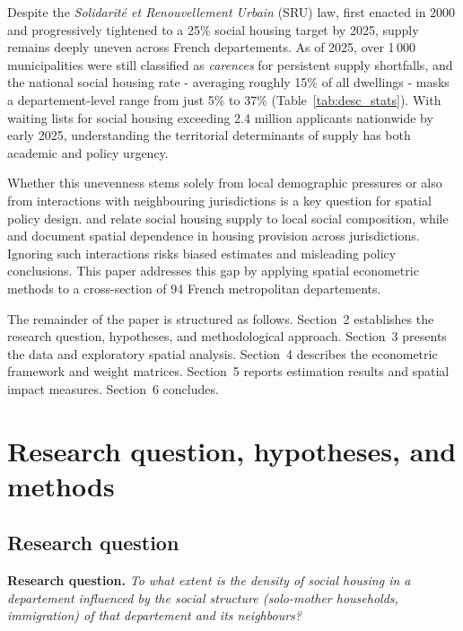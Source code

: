 \documentclass[a4paper,12pt]{article}
\begin{document}
Despite the \emph{Solidarité et Renouvellement Urbain} (SRU) law, first enacted in 2000 and progressively tightened to a 25\% social housing target by 2025, supply remains deeply uneven across French departements. As of 2025, over 1\,000 municipalities were still classified as \emph{carences} for persistent supply shortfalls, and the national social housing rate - averaging roughly 15\% of all dwellings - masks a departement-level range from just 5\% to 37\% (Table~\ref{tab:desc_stats}). With waiting lists for social housing exceeding 2.4 million applicants nationwide by early 2025, understanding the territorial determinants of supply has both academic and policy urgency.

\medskip

Whether this unevenness stems solely from local demographic pressures or also from interactions with neighbouring jurisdictions is a key question for spatial policy design. \citet{chapelle2022} and \citet{maaoui2023} relate social housing supply to local social composition, while \citet{wang2025} and \citet{beenstock2015} document spatial dependence in housing provision across jurisdictions. Ignoring such interactions risks biased estimates and misleading policy conclusions. This paper addresses this gap by applying spatial econometric methods to a cross-section of 94 French metropolitan departements.

\medskip

The remainder of the paper is structured as follows. Section~2 establishes the research question, hypotheses, and methodological approach. Section~3 presents the data and exploratory spatial analysis. Section~4 describes the econometric framework and weight matrices. Section~5 reports estimation results and spatial impact measures. Section~6 concludes.

\newpage

\section{Research question, hypotheses, and methods}

\subsection{Research question}

\textbf{Research question.} \emph{To what extent is the density of social housing in a departement influenced by the social structure (solo-mother households, immigration) of that departement and its neighbours?}
\end{document}
